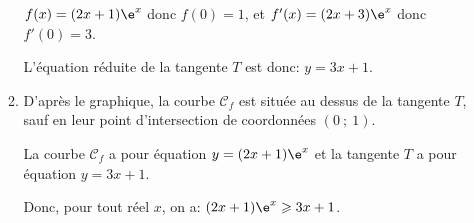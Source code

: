 \begin{enumerate}
\begin{enumerate}
$f(x)=(2x+1)\e^{x}$ donc $f(0)=1$, et $f'(x)=(2x+3)\e^{x}$ donc $f'(0)=3$.

L'équation réduite de la tangente $T$ est donc: $y=3x+1$.
 
\item%
D'après le graphique, la courbe $\mathcal{C}_f$ est située au dessus de la tangente $T$, sauf en leur point d'intersection de coordonnées $(0~;~1)$.

La courbe $\mathcal{C}_f$ a pour équation $y=(2x+1)\e^{x}$ et  la tangente $T$ a pour équation $y=3x+1$.

Donc, pour tout réel $x$, on a: $(2x+1)\e^{x} \geqslant 3x+1$.
\end{enumerate}
\end{enumerate}

\vspace{0,5cm}

